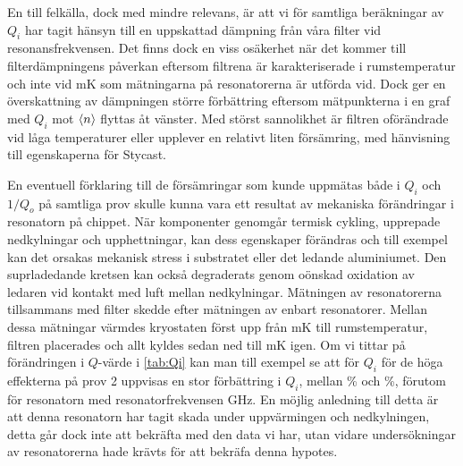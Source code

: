 \documentclass[main.tex]{subfiles}
\begin{document}
En till felkälla, dock med mindre relevans, är att vi för samtliga beräkningar av $Q_i$ har tagit hänsyn till en uppskattad dämpning från våra filter vid resonansfrekvensen. Det finns dock en viss osäkerhet när det kommer till filterdämpningens påverkan eftersom filtrena är karakteriserade i rumstemperatur och inte vid \unit[10]{mK} som mätningarna på resonatorerna är utförda vid. Dock ger en överskattning av dämpningen större förbättring eftersom mätpunkterna i en graf med $Q_i$ mot $\expval{n}$ flyttas åt vänster. Med störst sannolikhet är filtren oförändrade vid låga temperaturer eller upplever en relativt liten försämring, med hänvisning till egenskaperna för Stycast.



En eventuell förklaring till de försämringar som kunde uppmätas både i $Q_i$ och $1/Q_o$ på samtliga prov skulle kunna vara ett resultat av mekaniska förändringar i resonatorn på chippet. När komponenter genomgår termisk cykling, upprepade nedkylningar och upphettningar, kan dess egenskaper förändras och till exempel kan det orsakas mekanisk stress i substratet eller det ledande aluminiumet. Den suprladedande kretsen kan också degraderats genom oönskad oxidation av ledaren vid kontakt med luft mellan nedkylningar. Mätningen av resonatorerna tillsammans med filter skedde efter mätningen av enbart resonatorer. Mellan dessa mätningar värmdes kryostaten först upp från \unit[10]{mK} till rumstemperatur, filtren placerades och allt kyldes sedan ned till \unit[10]{mK} igen. Om vi tittar på förändringen i $Q$-värde i \ref{tab:Qi} kan man till exempel se att för $Q_i$ för de höga effekterna på prov 2 uppvisas en stor förbättring i $Q_i$, mellan \unit[11]{\%} och \unit[26]{\%}, förutom för resonatorn med resonatorfrekvensen \unit[7,322]{GHz}. En möjlig anledning till detta är att denna resonatorn har tagit skada under uppvärmingen och nedkylningen, detta går dock inte att bekräfta med den data vi har, utan vidare undersökningar av resonatorerna hade krävts för att bekräfa denna hypotes.

\end{document}
